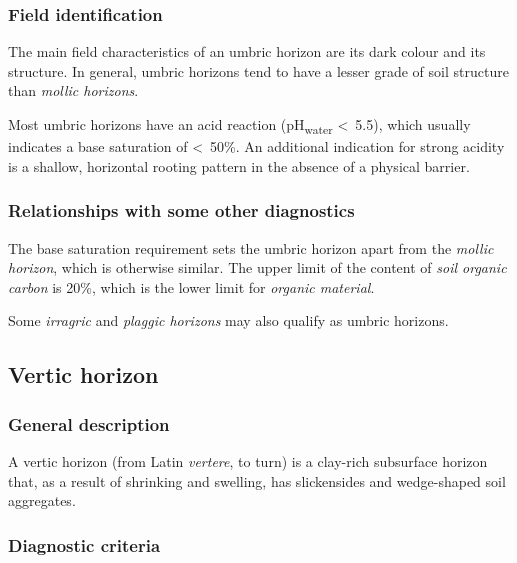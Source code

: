 \documentclass[
  letterpaper,
  DIV=11,
  numbers=noendperiod]{scrreprt}
\begin{document}
\hypertarget{field-identification-30}{%
\subsubsection{Field identification}\label{field-identification-30}}

The main field characteristics of an umbric horizon are its dark colour
and its structure. In general, umbric horizons tend to have a lesser
grade of soil structure than \emph{mollic horizons}.

Most umbric horizons have an acid reaction (pH\textsubscript{water}
\textless~5.5), which usually indicates a base saturation of
\textless~50\%. An additional indication for strong acidity is a
shallow, horizontal rooting pattern in the absence of a physical
barrier.

\hypertarget{relationships-with-some-other-diagnostics-37}{%
\subsubsection{Relationships with some other
diagnostics}\label{relationships-with-some-other-diagnostics-37}}

The base saturation requirement sets the umbric horizon apart from the
\emph{mollic horizon}, which is otherwise similar. The upper limit of
the content of \emph{soil organic carbon} is 20\%, which is the lower
limit for \emph{organic material}.

Some \emph{irragric} and \emph{plaggic horizons} may also qualify as
umbric horizons.

\hypertarget{vertic-horizon}{%
\subsection{Vertic horizon}\label{vertic-horizon}}

\hypertarget{general-description-39}{%
\subsubsection{General description}\label{general-description-39}}

A vertic horizon (from Latin \emph{vertere}, to turn) is a clay-rich
subsurface horizon that, as a result of shrinking and swelling, has
slickensides and wedge-shaped soil aggregates.

\hypertarget{diagnostic-criteria-39}{%
\subsubsection{Diagnostic criteria}\label{diagnostic-criteria-39}}
\end{document}
